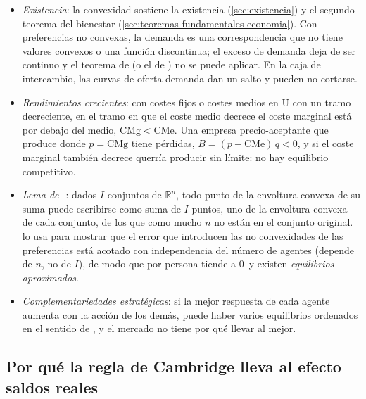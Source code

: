 \documentclass[11pt]{article}
\begin{document}
\begin{itemize}
\item \emph{Existencia}: la convexidad sostiene la existencia (\ref{sec:existencia}) y el segundo teorema del bienestar (\ref{sec:teoremas-fundamentales-economia}). Con preferencias no convexas, la demanda es una correspondencia que no tiene valores convexos o una función discontinua; el exceso de demanda deja de ser continuo y el teorema de  (o el de ) no se puede aplicar. En la caja de intercambio, las curvas de oferta-demanda dan un salto y pueden no cortarse.
\item \emph{Rendimientos crecientes}: con costes fijos o costes medios en U con un tramo decreciente, en el tramo en que el coste medio decrece el coste marginal está por debajo del medio, $\mathrm{CMg}<\mathrm{CMe}$. Una empresa precio-aceptante que produce donde $p=\mathrm{CMg}$ tiene pérdidas, $B=(p-\mathrm{CMe})\,q<0$, y si el coste marginal también decrece querría producir sin límite: no hay equilibrio competitivo.
\item \emph{Lema de -}: dados $I$ conjuntos de $\mathbb{R}^n$, todo punto de la envoltura convexa de su suma puede escribirse como suma de $I$ puntos, uno de la envoltura convexa de cada conjunto, de los que como mucho $n$ no están en el conjunto original. \textcite{Starr1969Quasi} lo usa para mostrar que el error que introducen las no convexidades de las preferencias está acotado con independencia del número de agentes (depende de $n$, no de $I$), de modo que por persona tiende a 0~y existen \emph{equilibrios aproximados}\nocite{MasColellWhinstonGreen1995}.
\item \emph{Complementariedades estratégicas}: si la mejor respuesta de cada agente aumenta con la acción de los demás, puede haber varios equilibrios ordenados en el sentido de , y el mercado no tiene por qué llevar al mejor\nocite{CooperJohn1988Coordinating}.
\end{itemize}

\subsection{Por qué la regla de Cambridge lleva al efecto saldos reales}\label{anexo:cambridge}
\end{document}
